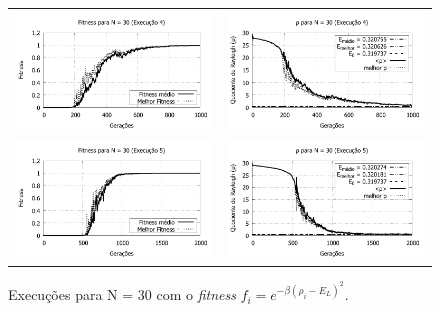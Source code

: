\begin{figure}[p]
\begin{tabular}{@{}cc@{}}
		\includegraphics[width=.40\textwidth]{figs/resultados/fitnessEL/N-30_E-4_fitness-extendido.pdf} &
    \includegraphics[width=.40\textwidth]{figs/resultados/fitnessEL/N-30_E-4_rho_extendido.pdf} \\
		\includegraphics[width=.40\textwidth]{figs/resultados/fitnessEL/N-30_E-5_fitness-extendido.pdf} &
    \includegraphics[width=.40\textwidth]{figs/resultados/fitnessEL/N-30_E-5_rho_extendido.pdf}
  \end{tabular}
  \caption{Execuções para N = 30 com o \textit{fitness} $f_i = e^{-\beta(\rho_i - E_L)^2}$.}
	\label{fig:execucoes_N30_EL}
	\end{figure}
	
